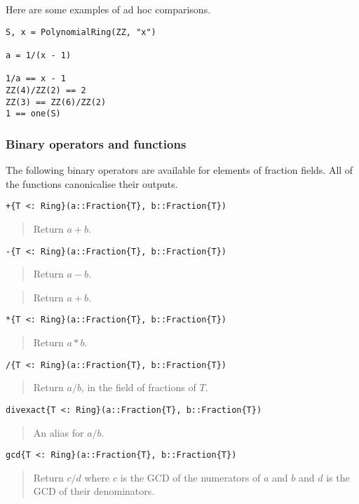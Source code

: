 \documentclass[a4paper,10pt]{article}
\newcommand{\desc}[1]{\vspace{-3mm}\begin{quote}#1\end{quote}}
\begin{document}
{{Here are some examples of ad hoc comparisons.

\begin{lstlisting}
S, x = PolynomialRing(ZZ, "x")

a = 1/(x - 1)

1/a == x - 1
ZZ(4)/ZZ(2) == 2
ZZ(3) == ZZ(6)/ZZ(2)
1 == one(S)
\end{lstlisting}

\subsubsection{Binary operators and functions}

The following binary operators are available for elements of fraction fields.
All of the functions canonicalise their outputs.

\begin{lstlisting}
+{T <: Ring}(a::Fraction{T}, b::Fraction{T})
\end{lstlisting}

\desc{Return $a + b$.}

\begin{lstlisting}
-{T <: Ring}(a::Fraction{T}, b::Fraction{T})
\end{lstlisting}

\desc{Return $a - b$.}

\desc{Return $a + b$.}

\begin{lstlisting}
*{T <: Ring}(a::Fraction{T}, b::Fraction{T})
\end{lstlisting}

\desc{Return $a*b$.}

\begin{lstlisting}
/{T <: Ring}(a::Fraction{T}, b::Fraction{T})
\end{lstlisting}

\desc{Return $a/b$, in the field of fractions of $T$.}

\begin{lstlisting}
divexact{T <: Ring}(a::Fraction{T}, b::Fraction{T})
\end{lstlisting}

\desc{An alias for $a/b$.}

\begin{lstlisting}
gcd{T <: Ring}(a::Fraction{T}, b::Fraction{T})
\end{lstlisting}

\desc{Return $c/d$ where $c$ is the GCD of the numerators of $a$ and $b$ and
$d$ is the GCD of their denominators.}

}}
\end{document}
